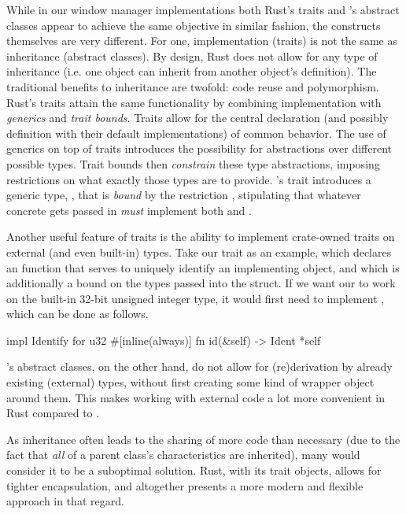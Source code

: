 While in our window manager implementations both Rust's traits and \cpp's
abstract classes appear to achieve the same objective in similar fashion, the
constructs themselves are very different. For one, implementation (traits)
is not the same as inheritance (abstract classes). By design, Rust does not
allow for any type of inheritance (i.e. one object can inherit from another
object's definition). The traditional benefits to inheritance are twofold:
code reuse and polymorphism. Rust's traits attain the same functionality
by combining implementation with \textit{generics} and \textit{trait
bounds}\cite{therustbook, rustblogtraits}. Traits allow for the central
declaration (and possibly definition with their default implementations) of
common behavior\cite{therustbook, rustblogtraits}. The use of generics on top
of traits introduces the possibility for abstractions over different possible
types\cite{therustbook, rustblogtraits}. Trait bounds then \textit{constrain}
these type abstractions, imposing restrictions on what exactly those types
are to provide\cite{therustbook, rustblogtraits, therustreference}. \wmrs's
 trait introduces a generic type, , that is \textit{bound}
by the restriction , stipulating that whatever concrete
 gets passed in \textit{must} implement both  and
.

Another useful feature of traits is the ability to implement crate-owned
traits on external (and even built-in) types. Take our  trait
as an example, which declares an  function that serves to uniquely
identify an implementing object, and which is additionally a bound on the types
passed into the  struct. If we want our  to work on
the built-in 32-bit unsigned integer type, it would first need to implement
, which can be done as follows.

\begin{rustblock}
  impl Identify for u32 {
    #[inline(always)]
    fn id(&self) -> Ident {
      *self
    }
  }
\end{rustblock}

\cpp's abstract classes, on the other hand, do not allow for (re)derivation by
already existing (external) types, without first creating some kind of wrapper
object around them. This makes working with external code a lot more convenient
in Rust compared to \cpp.

As inheritance often leads to the sharing of more code than necessary (due to
the fact that \textit{all} of a parent class's characteristics are inherited),
many would consider it to be a suboptimal solution. Rust, with its trait
objects, allows for tighter encapsulation, and altogether presents a more modern
and flexible approach in that regard.
